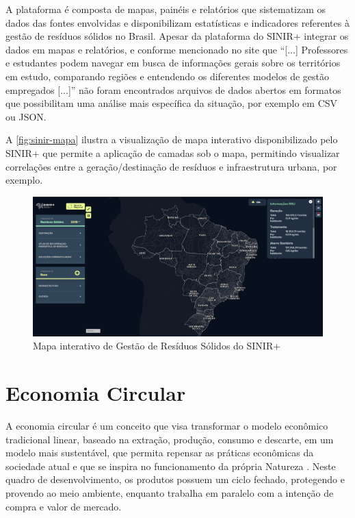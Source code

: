 A plataforma é composta de mapas, painéis e relatórios que sistematizam os dados das fontes envolvidas e disponibilizam estatísticas e indicadores referentes à gestão de resíduos sólidos no Brasil. Apesar da plataforma do \gls{SINIR}+ integrar os dados em mapas e relatórios, e conforme mencionado no site que “[...] Professores e estudantes podem navegar em busca de informações gerais sobre os territórios em estudo, comparando regiões e entendendo os diferentes modelos de gestão empregados [...]” não foram encontrados arquivos de dados abertos em formatos que possibilitam uma análise mais específica da situação, por exemplo em \gls{CSV} ou \gls{JSON}.

A \autoref{fig:sinir-mapa} ilustra a visualização de mapa interativo disponibilizado pelo \gls{SINIR}+ que permite a aplicação de camadas sob o mapa, permitindo visualizar correlações entre a geração/destinação de resíduos e infraestrutura urbana, por exemplo.

\begin{figure}[htb]
	\caption{\label{fig:sinir-mapa} Mapa interativo de Gestão de Resíduos Sólidos do SINIR+}
	\begin{center}
		\includegraphics[scale=0.3]{images/sinir-mapa.png}
	\end{center}
\end{figure}

\pagebreak

\section{Economia Circular}
A economia circular é um conceito que visa transformar o modelo econômico tradicional linear, baseado na extração, produção, consumo e descarte, em um modelo mais sustentável, que permita repensar as práticas econômicas da sociedade atual e que se inspira no funcionamento da própria Natureza \cite{leitao_economia_2015}. Neste quadro de desenvolvimento, os produtos possuem um ciclo fechado, protegendo e provendo ao meio ambiente, enquanto trabalha em paralelo com a intenção de compra e valor de mercado.

